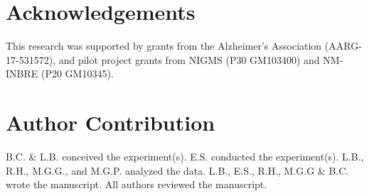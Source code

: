 \documentclass[fleqn,10pt]{wlscirep}
\begin{document}




\section*{Acknowledgements}
This research was supported by grants from the Alzheimer’s Association (AARG-17-531572), and pilot project grants from NIGMS (P30 GM103400) and NM-INBRE (P20 GM10345).

\section*{Author Contribution}
B.C. \& L.B. conceived the experiment(s). E.S. conducted the experiment(s). L.B., R.H., M.G.G., and M.G.P. analyzed the data. L.B., E.S., R.H., M.G.G \& B.C. wrote the manuscript. All authors reviewed the manuscript. 



\end{document}

